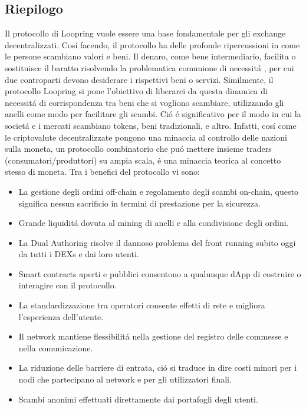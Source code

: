 \documentclass[UTF8,nofonts]{article}
\begin{document}
\begin{multicols}{2}
\section{Riepilogo}
Il protocollo di Loopring vuole essere una base fondamentale per gli exchange decentralizzati. Cos\'i facendo, il protocollo ha delle profonde ripercussioni in come le persone scambiano valori e beni. Il denaro, come bene intermediario, facilita o sostituisce il baratto risolvendo la problematica comunione di necessit\'a \cite{unenumerated2006}, per cui due controparti devono desiderare i rispettivi  beni o servizi. Similmente, il protocollo Loopring si pone l'obiettivo di liberarci da questa dinamica di necessit\'a di corrispondenza tra beni che si vogliono scambiare, utilizzando gli anelli come modo per facilitare gli scambi. Ci\'o \'e significativo per il modo in cui la societ\'a e i mercati scambiano tokens, beni tradizionali, e altro. Infatti, cos\'i come le criptovalute decentralizzate pongono una minaccia al controllo delle nazioni sulla moneta, un protocollo combinatorio che pu\'o mettere insieme traders (consumatori/produttori) su ampia scala, \'e una minaccia teorica al concetto stesso di moneta.
Tra i benefici del protocollo vi sono:
\begin{itemize}
	\item La gestione degli ordini off-chain e regolamento degli scambi on-chain, questo significa nessun sacrificio in termini di prestazione per la sicurezza.
	\item Grande liquidit\'a dovuta al mining di anelli e alla condivisione degli ordini.
	\item La Dual Authoring risolve il dannoso problema del front running subito oggi da tutti i DEXs e dai loro utenti.
	\item Smart contracts aperti e pubblici consentono a qualunque dApp di costruire o interagire con il protocollo.
	\item La standardizzazione tra operatori consente effetti di rete e migliora l'esperienza dell'utente.
	\item Il network mantiene flessibilit\'a nella gestione del registro delle commesse e nella comunicazione.
	\item La riduzione delle barriere di entrata, ci\'o si traduce in dire costi minori per i nodi che partecipano al network e per gli utilizzatori finali.
	\item Scambi anonimi effettuati direttamente dai portafogli degli utenti.
\end{itemize}

\end{multicols}
\end{document}
